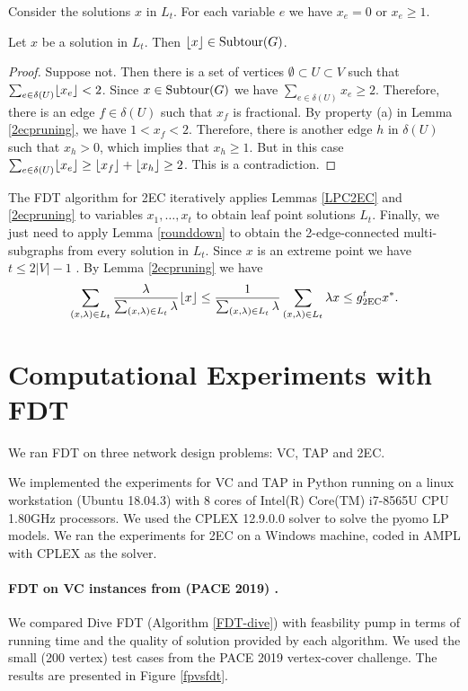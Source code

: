 Consider the solutions $x$ in $L_t$. For each variable $e$ we have $x_e=0$ or $x_e\geq 1$. 
\begin{lemma}\label{rounddown}
	Let $x$ be a solution in $L_t$. Then $\lfloor x\rfloor \in \operatorname{{Subtour}}(G)$. 
\end{lemma}
\begin{proof}
	Suppose not. Then there is a set of vertices $\emptyset \subset U \subset V$ such that $\sum_{e\in \delta(U)}\lfloor x_e\rfloor<2$. Since $x\in \operatorname{{Subtour}}(G)$ we have $\sum_{e\in \delta(U)}x_e \geq 2$. Therefore, there is an edge $f\in \delta(U)$ such that $x_f$ is fractional. By property (a) in Lemma \ref{2ecpruning}, we have $1<  x_f < 2$. Therefore, there is another edge $h$ in $\delta(U)$ such that $x_h>0$, which implies that $x_h\geq 1$. But in this case $\sum_{e\in \delta(U)}\lfloor x_e\rfloor\geq  \lfloor x_f\rfloor+\lfloor x_h\rfloor  \geq 2$. This is a contradiction.
\end{proof}

The FDT algorithm for 2EC iteratively applies Lemmas \ref{LPC2EC} and \ref{2ecpruning} to variables $x_1,\ldots,x_t$ to obtain leaf point solutions $L_t$. Finally, we just need to apply Lemma \ref{rounddown} to obtain the 2-edge-connected multi-subgraphs from every solution in $L_t$. Since $x$ is an extreme point we have $t\leq 2|V|-1$ \cite{boydpulley}. By Lemma \ref{2ecpruning} we have
\begin{align*}
\sum_{(x,\lambda)\in L_t} \frac{\lambda}{\sum_{(x,\lambda)\in L_t}\lambda} \floor{x} \leq \frac{1}{\sum_{(x,\lambda)\in L_t}\lambda} \sum_{(x,\lambda)\in L_t} \lambda {x} \leq g^t_{\2ec} x^*.
\end{align*}
\section{Computational Experiments with FDT}\label{sec:experiment}
We ran FDT on three network design problems: VC, TAP and 2EC. 

We implemented the experiments for VC and TAP in Python running on a linux workstation (Ubuntu 18.04.3) with 8 cores of Intel(R) Core(TM) i7-8565U CPU  1.80GHz processors. We used the CPLEX 12.9.0.0 solver to solve the pyomo LP models. We ran the experiments for 2EC on a Windows machine, coded in AMPL with CPLEX as the solver.
\paragraph{FDT on VC instances from (PACE 2019) \cite{PACE}.}


We compared Dive FDT (Algorithm \ref{FDT-dive}) with feasbility pump \cite{fp1} in terms of running time
and the quality of solution provided by each algorithm. We used the small (200 vertex) test cases from the PACE 2019 vertex-cover challenge. The results are presented in Figure \ref{fpvsfdt}. 


